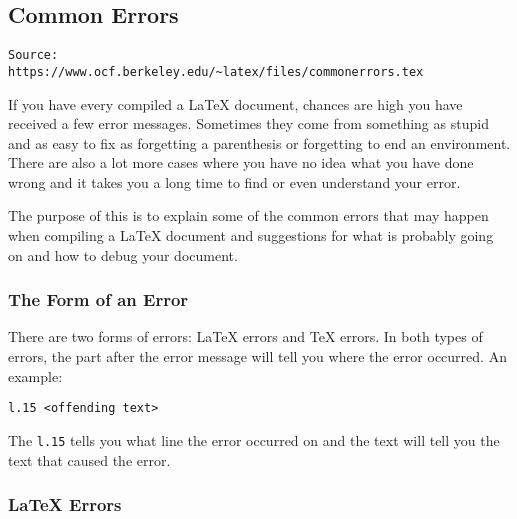 %
%
%
%
% 
\subsection{Common Errors}
\label{cha:common-errors}
\begin{verbatim}
Source:
https://www.ocf.berkeley.edu/~latex/files/commonerrors.tex
\end{verbatim}


If you have every compiled a \LaTeX{} document, chances are high you
have received a few error messages.  Sometimes they come from
something as stupid and as easy to fix as forgetting a parenthesis or
forgetting to end an environment.  There are also a lot more cases
where you have no idea what you have done wrong and it takes you a
long time to find or even understand your error.

The purpose of this is to explain some of the common errors that may
happen when compiling a \LaTeX{} document and suggestions for what is
probably going on and how to debug your document.

\subsubsection{The Form of an Error}
\label{sec:form-an-error}

There are two forms of errors: \LaTeX{} errors and \TeX{} errors.  In
both types of errors, the part after the error message will tell you
where the error occurred.  An example:
\begin{verbatim}
l.15 <offending text>
\end{verbatim}
The \texttt{l.15} tells you what line the error occurred on and the
text will tell you the text that caused the error.

\subsubsection{\LaTeX{} Errors}
\label{sec:latex-errors}

